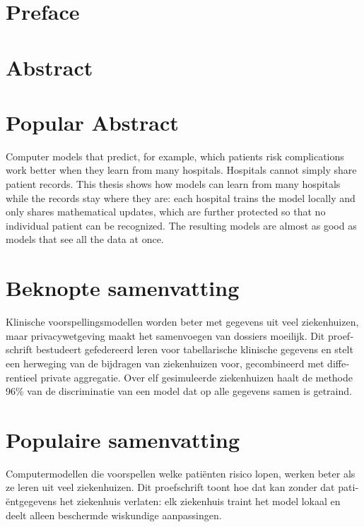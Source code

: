 \documentclass[10pt,twoside,openright]{report}
\begin{document}




\chapter*{Preface}

\cleardoublepage
\chapter*{Abstract}

\cleardoublepage
\chapter*{Popular Abstract}
Computer models that predict, for example, which patients risk complications work better when
they learn from many hospitals. Hospitals cannot simply share patient records. This thesis
shows how models can learn from many hospitals while the records stay where they are: each
hospital trains the model locally and only shares mathematical updates, which are further
protected so that no individual patient can be recognized. The resulting models are almost as
good as models that see all the data at once.
\cleardoublepage
\begin{otherlanguage}{dutch}
\chapter*{Beknopte samenvatting}
Klinische voorspellingsmodellen worden beter met gegevens uit veel ziekenhuizen, maar
privacywetgeving maakt het samenvoegen van dossiers moeilijk. Dit proefschrift bestudeert
gefedereerd leren voor tabellarische klinische gegevens en stelt een herweging van de
bijdragen van ziekenhuizen voor, gecombineerd met differentieel private aggregatie. Over elf
gesimuleerde ziekenhuizen haalt de methode 96\% van de discriminatie van een model dat op alle
gegevens samen is getraind.
\cleardoublepage
\chapter*{Populaire samenvatting}
Computermodellen die voorspellen welke patiënten risico lopen, werken beter als ze leren uit
veel ziekenhuizen. Dit proefschrift toont hoe dat kan zonder dat patiëntgegevens het
ziekenhuis verlaten: elk ziekenhuis traint het model lokaal en deelt alleen beschermde
wiskundige aanpassingen.
\end{otherlanguage}
\cleardoublepage
\end{document}
